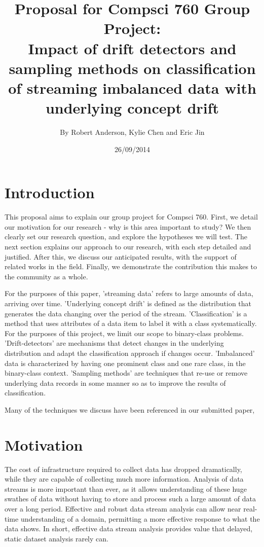 \documentclass[11pt]{article}\usepackage[]{graphicx}\usepackage[]{color}
\title{\textbf{Proposal for Compsci 760 Group Project:} \\
Impact of drift detectors and sampling methods on classification of streaming imbalanced data with underlying concept drift}
\author{By Robert Anderson, Kylie Chen and Eric Jin}
\date{26/09/2014}
\begin{document}
\maketitle


\section{Introduction}

This proposal aims to explain our group project for Compsci 760. First, we detail our motivation for our research - why is this area important to study? We then clearly set our research question, and explore the hypotheses we will test. The next section explains our approach to our research, with each step detailed and justified. After this, we discuss our anticipated results, with the support of related works in the field. Finally, we demonstrate the contribution this makes to the community as a whole.

For the purposes of this paper, 'streaming data' refers to large amounts of data, arriving over time. 'Underlying concept drift' is defined as the distribution that generates the data changing over the period of the stream. 'Classification' is a method that uses attributes of a data item to label it with a class systematically. For the purposes of this project, we limit our scope to binary-class problems. 'Drift-detectors' are mechanisms that detect changes in the underlying distribution and adapt the classification approach if changes occur. 'Imbalanced' data is characterized by having one prominent class and one rare class, in the binary-class context.  'Sampling methods' are techniques that re-use or remove underlying data records in some manner so as to improve the results of classification.

Many of the techniques we discuss have been referenced in our submitted paper, 

\section{Motivation}

The cost of infrastructure required to collect data has dropped dramatically, while they are capable of collecting much more information. Analysis of data streams is more important than ever, as it allows understanding of these huge swathes of data without having to store and process such a large amount of data over a long period. Effective and robust data stream analysis can allow near real-time understanding of a domain, permitting a more effective response to what the data shows. In short, effective data stream analysis provides value that delayed, static dataset analysis rarely can.
\end{document}
